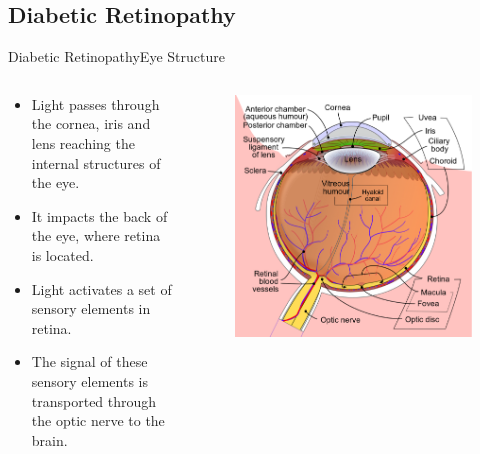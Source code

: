 \documentclass{beamer}
\begin{document}
\subsection{Diabetic Retinopathy}

\begin{frame}{Diabetic Retinopathy}{Eye Structure}
\begin{columns}
	\begin{column}{0.6\textwidth}
		\begin{itemize}
			\item {Light passes through the cornea, iris and lens reaching the internal structures of the eye.}
			\item {It impacts the back of the eye, where retina is located.}
			\item{Light activates a set of sensory elements in retina.}
			\item{The signal of these sensory elements is transported through the optic nerve to the brain.}
		\end{itemize}	
	\end{column}
	\begin{column}{0.4\textwidth}  %
		\begin{figure}[p]
			\centering
			\includegraphics[width=\textwidth]{eye_en.eps}
		\end{figure}
	\end{column}
\end{columns}
\end{frame}
\end{document}
